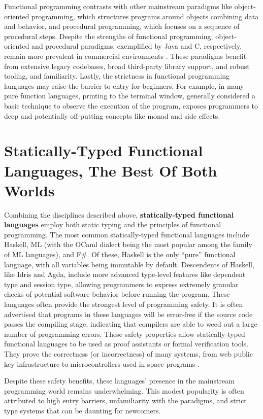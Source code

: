 Functional programming contrasts with other mainstream paradigms like object-oriented programming, which structures programs around objects combining data and behavior, and procedural programming, which focuses on a sequence of procedural steps. Despite the strengths of functional programming, object-oriented and procedural paradigms, exemplified by Java and C, respectively, remain more prevalent in commercial environments \cite{StackOverflow2023-cp, Cass2023-fa}. These paradigms benefit from extensive legacy codebases, broad third-party library support, and robust tooling, and familiarity. Lastly, the strictness in functional programming languages may raise the barrier to entry for beginners. For example, in many pure function languages, printing to the terminal window, generally considered a basic technique to observe the execution of the program, exposes programmers to deep and potentially off-putting concepts like monad and side effects.  


\section{Statically-Typed Functional Languages, The Best Of Both Worlds}
Combining the disciplines described above, \textbf{statically-typed functional languages} employ both static typing and the principles of functional programming. The most common statically-typed functional languages include Haskell,  ML (with the OCaml dialect being the most popular among the family of ML languages), and F\#. 
Of these, Haskell is the only ``pure'' functional language, with all variables being immutable by default.
Descendents of Haskell, like Idris and Agda, include more advanced type-level features like dependent type and session type, allowing programmers to express extremely granular checks of potential software behavior before running the program. These languages often provide the strongest level of programming safety. It is often advertised that programs in these languages will be error-free if the source code passes the compiling stage, indicating that compilers are able to weed out a large number of programming errors. These safety properties allow statically-typed functional languages to be used as proof assistants or formal verification tools. They prove the correctness (or incorrectness) of many systems, from web public key infrastructure \cite{Bhargavan2021-no} to microcontrollers used in space programs \cite{Mokhov2019-zj}. 

Despite these safety benefits, these languages' presence in the mainstream programming world remains underwhelming. This modest popularity is often attributed to high entry barriers, unfamiliarity with the paradigms, and strict type systems that can be daunting for newcomers.

